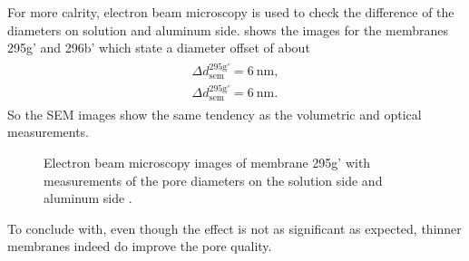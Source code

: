 \documentclass[../thesis.tex]{subfiles}
\begin{document}
          For more calrity, electron beam microscopy is used to check the difference of the diameters on solution and aluminum side.  shows the images for the membranes 295g' and 296b' which state a diameter offset of about
          \begin{align}
            \begin{split}
              \Delta d_\mathrm{sem}^\mathrm{295g'}=\SI{6}{\nano\meter}, \\
              \Delta d_\mathrm{sem}^\mathrm{295g'}=\SI{6}{\nano\meter}.
            \end{split}
          \end{align}
          So the SEM images show the same tendency as the volumetric and optical measurements.
          \medskip

          \begin{figure}[htb]
            \centering
            \hfill
            \caption{Electron beam microscopy images of membrane 295g' with measurements of the pore diameters on the solution side \protect{} and aluminum side \protect{}.}
            \label{fig:meb-funnelling}
          \end{figure}

          To conclude with, even though the effect is not as significant as expected, thinner membranes indeed do improve the pore quality.
\end{document}
